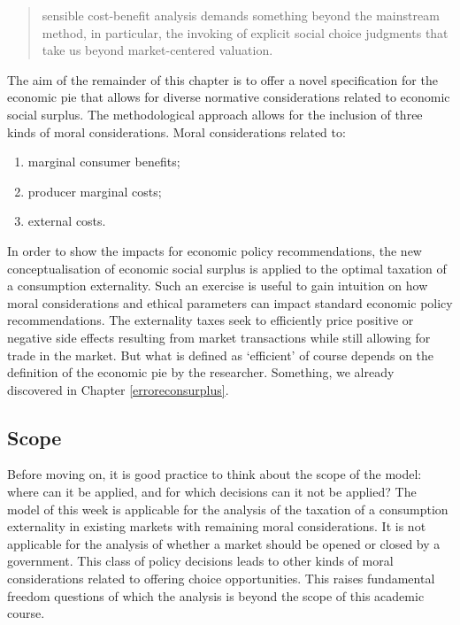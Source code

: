 \documentclass[
]{book}
\providecommand{\tightlist}{%
  \setlength{\itemsep}{0pt}\setlength{\parskip}{0pt}}
\begin{document}
\begin{quote}
sensible cost-benefit analysis demands something beyond the mainstream method, in particular, the invoking of explicit social choice judgments that take us beyond market-centered valuation.
\end{quote}

The aim of the remainder of this chapter is to offer a novel specification for the economic pie that allows for diverse normative considerations related to economic social surplus. The methodological approach allows for the inclusion of three kinds of moral considerations. Moral considerations related to:

\begin{enumerate}
\def\labelenumi{(\roman{enumi})}
\tightlist
\item
  marginal consumer benefits;
\item
  producer marginal costs;
\item
  external costs.
\end{enumerate}

In order to show the impacts for economic policy recommendations, the new conceptualisation of economic social surplus is applied to the optimal taxation of a consumption externality. Such an exercise is useful to gain intuition on how moral considerations and ethical parameters can impact standard economic policy recommendations. The externality taxes seek to efficiently price positive or negative side effects resulting from market transactions while still allowing for trade in the market. But what is defined as `efficient' of course depends on the definition of the economic pie by the researcher. Something, we already discovered in Chapter \ref{erroreconsurplus}.

\hypertarget{scope}{%
\subsection{Scope}\label{scope}}

Before moving on, it is good practice to think about the scope of the model: where can it be applied, and for which decisions can it not be applied? The model of this week is applicable for the analysis of the taxation of a consumption externality in existing markets with remaining moral considerations. It is not applicable for the analysis of whether a market should be opened or closed by a government. This class of policy decisions leads to other kinds of moral considerations related to offering choice opportunities. This raises fundamental freedom questions of which the analysis is beyond the scope of this academic course.
\end{document}
